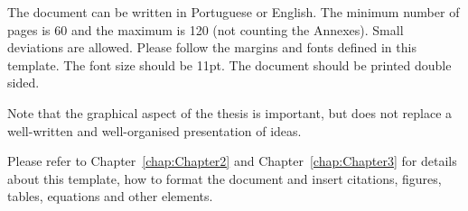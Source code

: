 The document can be written in Portuguese or English. The minimum number of pages is 60 and the maximum is 120 (not counting the Annexes). Small deviations are allowed. Please follow the margins and fonts  defined in this template. The font size should be 11pt. The document should be printed double sided.

Note that the graphical aspect of the thesis is important, but does not replace a well-written and well-organised presentation of ideas.

Please refer to Chapter~\ref{chap:Chapter2} and Chapter~\ref{chap:Chapter3} for details about this template, how to format the document and insert citations, figures, tables, equations and other elements.
